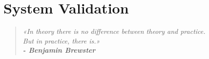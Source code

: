 \chapter{System Validation}
\label{cha:system_validation}

\begin{quotation}
\begin{flushright}
\itshape
«In theory there is no difference between theory and practice.\\ But in practice, there is.»\\
\textbf{- Benjamin Brewster}
\end{flushright}
\end{quotation}
